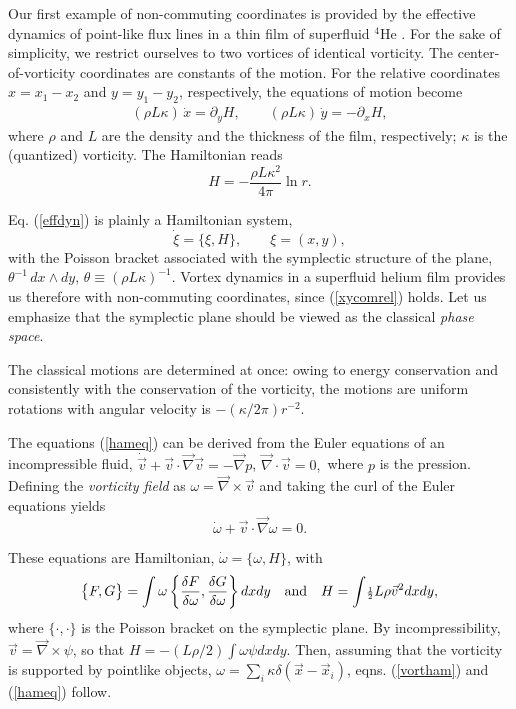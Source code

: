\documentclass[a4paper,12pt]{article}
\newcommand\half{{\scriptstyle{\frac{1}{2}}}}
\newcommand{\vx}{{\vec x}}
\newcommand{\vv}{{\vec v}}
\newcommand{\vnabla}{{\vec\nabla}}
\begin{document}
Our first example of non-commuting coordinates is provided by
the effective dynamics of point-like flux lines in a thin film of
superfluid ${}^4$He \cite{Onsager,MaWe}.
For the sake of simplicity, we restrict ourselves to two 
vortices of identical vorticity. 
The center-of-vorticity coordinates are constants of the motion. 
For the relative coordinates 
$x=x_{1}-x_{2}$ and $y=y_{1}-y_{2}$, respectively,
the equations of motion become\cite{Onsager,MaWe,HMC}
\begin{eqnarray}
    (\rho L\kappa)\,\dot{x}=\partial_{y} H,
    \qquad
    (\rho L\kappa)\,\dot{y}=-\partial_{x} H,
     \label{effdyn}
\end{eqnarray}
where $\rho$ and $ L$ are the density and the thickness of the 
film, respectively; $\kappa$ is the (quantized) vorticity.  
The Hamiltonian reads 
\begin{equation}  
H=-\frac{\rho L\kappa^2}{4\pi}\ln r.
\label{vortham}
\end{equation}
\goodbreak

Eq. (\ref{effdyn}) is plainly a Hamiltonian system, 
\begin{equation}
	\dot{\xi}=\big\{\xi,H\big\},
	\qquad
\xi=(x,y),
\label{hameq}
\end{equation}
with the Poisson bracket associated with the symplectic structure 
of the plane,
$ 
\theta^{-1}\,dx\wedge dy,
\,
\theta\equiv(\rho L\kappa)^{-1}.
$
Vortex dynamics in a superfluid helium film provides us therefore
with non-commuting coordinates, since (\ref{xycomrel}) holds.
Let us emphasize that the symplectic plane should be viewed as
the classical {\it phase space}.

The classical motions are determined at once: owing to energy conservation
and consistently 
with the conservation of the vorticity, the motions 
are uniform rotations with angular velocity is
$-(\kappa/2\pi)r^{-2}$. 

The equations (\ref{hameq}) can be derived\cite{MaWe} from the 
Euler equations of an incompressible fluid, 
$\dot{\vv}+\vv\cdot\vnabla\vv=-\vnabla p$,
$
\vnabla\cdot\vv=0,
$
where $p$ is the pression. Defining the {\it vorticity field} 
as $\omega=\vnabla\times\vv$ and taking the curl of 
the Euler equations yields 
\begin{equation}
    \dot{\omega}+\vv\cdot\vnabla\omega=0.
\label{vorteq}
\end{equation}

These equations are Hamiltonian,
$\dot{\omega}=\big\{\omega,H\big\}$, with 
\begin{equation}
    \big\{F,G\big\}=\int\omega\left\{\frac{\delta F}{\delta\omega},
    \frac{\delta G}{\delta\omega}\right\}dxdy
    \quad\hbox{and}\quad
    H=\int\!
    \half L\rho\vv^2dxdy,
\label{Hamstruct}
\end{equation}
where $\big\{\cdot,\cdot\big\}$ is the 
Poisson bracket on the symplectic plane. By incompressibility,
$\vv=\vnabla\times\psi$, so that $H=-(L\rho/2)\int\omega\psi dxdy$.
Then, assuming that the vorticity is supported by pointlike objects, 
$\omega=\sum_{i}\kappa\delta(\vx-\vx_{i})$, 
eqns. (\ref{vortham}) and (\ref{hameq}) follow.
\end{document}
